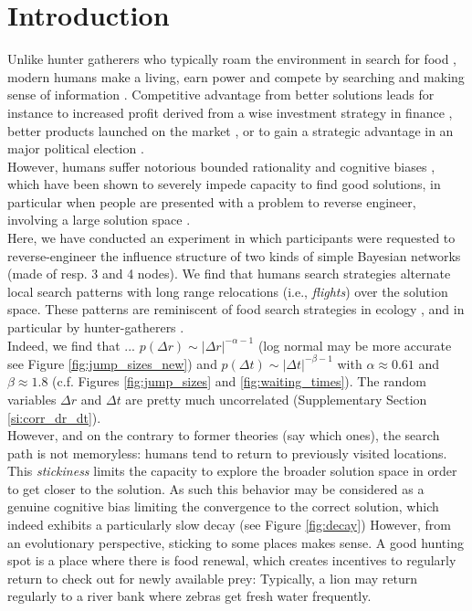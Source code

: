 \section{Introduction}
Unlike hunter gatherers who typically  roam the environment in search for food \cite{}, modern humans make a living, earn power and compete by searching and making sense of information \cite{}. Competitive advantage from better solutions leads for instance to increased profit derived from a wise investment strategy in finance \cite{}, better products launched on the market \cite{}, or to gain a strategic advantage in an major political election \cite{obama_ict}. \\

However, humans suffer notorious bounded rationality \cite{simon} and cognitive biases \cite{}, which have been shown to severely impede capacity to find good solutions, in particular when people are presented with a problem  to reverse engineer, involving a large solution space \cite{}.\\

Here, we have conducted an experiment in which participants were requested to reverse-engineer the influence structure of two kinds of simple Bayesian networks (made of resp. 3 and 4 nodes). We find that humans search strategies alternate local search patterns with long range relocations (i.e., {\it flights}) over the solution space. These patterns are reminiscent of food search strategies in ecology \cite{}, and in particular by hunter-gatherers \cite{}.\\

Indeed, we find that ...  $p(\Delta r) \sim |\Delta r | ^{-\alpha -1}$ (log normal may be more accurate see Figure \ref{fig:jump_sizes_new}) and $p(\Delta t) \sim  |\Delta t | ^{-\beta -1}$ with $\alpha \approx 0.61$ and $\beta \approx 1.8$ (c.f. Figures \ref{fig:jump_sizes} and \ref{fig:waiting_times}). The random variables $\Delta r$ and $\Delta t$ are pretty much uncorrelated (Supplementary Section \ref{si:corr_dr_dt}).\\

However, and on the contrary to former theories (say which ones), the search path is not memoryless: humans tend to return to previously visited locations. This {\it stickiness} limits the capacity to explore the broader solution space in order to get closer to the solution. As such this behavior may be considered as a genuine cognitive bias limiting the convergence to the correct solution, which indeed exhibits a particularly slow decay (see Figure \ref{fig:decay})  However, from an evolutionary perspective, sticking to some places makes sense. A good hunting spot is a place where there is food renewal, which creates incentives to regularly return to check out for newly available prey: Typically, a lion may return regularly to a river bank where zebras get fresh water frequently. \\

